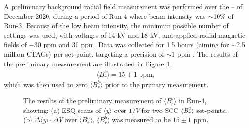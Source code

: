 A preliminary background radial field measurement was performed over the -- of December 2020, during a period of Run-4 where beam intensity was $\sim$10\% of Run-3. Because of the low beam intensity, the minimum possible number of settings was used, with voltages of 14 kV and 18 kV, and applied radial magnetic fields of $-$30 ppm and 30 ppm. Data was collected for 1.5 hours (aiming for $\sim$2.5 million CTAGs) per set-point, targeting a precision of $\sim1$ ppm \cite{PreliminaryMeasurementElog}. The results of the preliminary measurement are illustrated in Figure \ref{fig:PreliminaryFits},  
%
\begin{align*}
  \langle B_{r}^{b} \rangle = 15\pm1\text{ ppm},
\end{align*}
% 
which was then used to zero $\langle B_{r}^{b} \rangle$ prior to the primary measurement.
%   
\begin{figure}[t!]
\centering{}
{}
\caption{The results of the preliminary measurement of $\langle B_{r}^{b} \rangle$ in Run-4, showing: (a) ESQ scans of $\langle y \rangle$ over $1/V$ for two SCC $\langle B_{r}^{a} \rangle$ set-points; (b) $\Delta \langle y \rangle \cdot \Delta V$ over $\langle B_{r}^{a} \rangle$. $\langle B_{r}^{b} \rangle$ was measured to be $15\pm1$ ppm.}
\label{fig:PreliminaryFits}
\end{figure}

